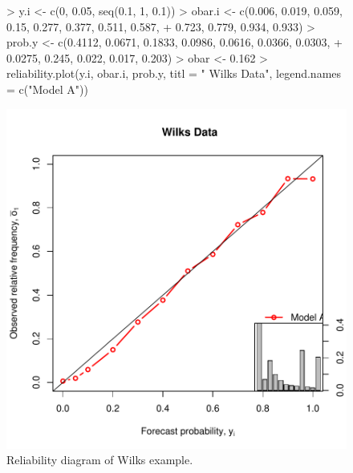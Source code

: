 \documentclass{article}
\begin{document}
\begin {center}
\begin{figure}[H]
\begin{Schunk}
\begin{Sinput}
> y.i <- c(0, 0.05, seq(0.1, 1, 0.1))
> obar.i <- c(0.006, 0.019, 0.059, 0.15, 0.277, 0.377, 0.511, 0.587, 
+     0.723, 0.779, 0.934, 0.933)
> prob.y <- c(0.4112, 0.0671, 0.1833, 0.0986, 0.0616, 0.0366, 0.0303, 
+     0.0275, 0.245, 0.022, 0.017, 0.203)
> obar <- 0.162
> reliability.plot(y.i, obar.i, prob.y, titl = " Wilks Data", legend.names = c("Model A"))
\end{Sinput}
\end{Schunk}
\includegraphics{verification-009}
\caption{\label{rel1} Reliability diagram of Wilks example. }
\end{figure}
\end{center}    


\nocite{*}

%

\end{document}
